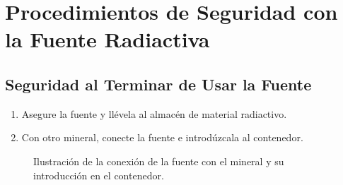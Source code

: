\section*{Procedimientos de Seguridad con la Fuente Radiactiva}


\subsection*{Seguridad al Terminar de Usar la Fuente}

\begin{enumerate}
    \item[7.4.12] Asegure la fuente y llévela al almacén de material radiactivo.
    \item[7.4.13] Con otro mineral, conecte la fuente e introdúzcala al contenedor.
\end{enumerate}

\begin{figure}[h]
    \centering
    \caption{Ilustración de la conexión de la fuente con el mineral y su introducción en el contenedor.}
    \label{fig:conexion_fuente}
\end{figure}